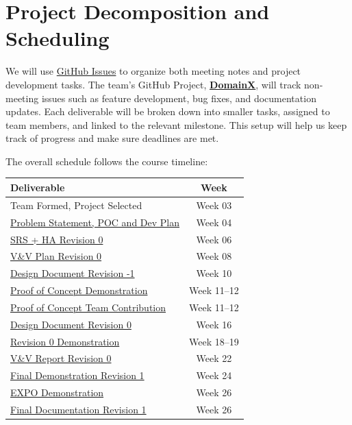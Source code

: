 \documentclass{article}
\begin{document}
\section{Project Decomposition and Scheduling}

We will use \href{https://github.com/thaafei/DomainX/issues}{GitHub Issues} to organize both meeting notes and project development tasks.
The team’s GitHub Project, \href{https://github.com/users/thaafei/projects/6}{\textbf{DomainX}}, will track non-meeting issues such as feature development, bug fixes, and documentation updates.
Each deliverable will be broken down into smaller tasks, assigned to team members, and linked to the relevant milestone.
This setup will help us keep track of progress and make sure deadlines are met.

The overall schedule follows the course timeline:

\begin{center}
\begin{tabular}{|l|c|}
\hline
\textbf{Deliverable} & \textbf{Week} \\
\hline
Team Formed, Project Selected & Week 03 \\
\href{https://github.com/thaafei/DomainX/milestone/1}{Problem Statement, POC and Dev Plan} & Week 04 \\
\href{https://github.com/thaafei/DomainX/milestone/2}{SRS + HA Revision 0} & Week 06 \\
\href{https://github.com/thaafei/DomainX/milestone/3}{V\&V Plan Revision 0} & Week 08 \\
\href{https://github.com/thaafei/DomainX/milestone/13}{Design Document Revision -1} & Week 10 \\
\href{https://github.com/thaafei/DomainX/milestone/5}{Proof of Concept Demonstration} & Week 11--12 \\
\href{https://github.com/thaafei/DomainX/milestone/12}{Proof of Concept Team Contribution} & Week 11--12 \\
\href{https://github.com/thaafei/DomainX/milestone/6}{Design Document Revision 0} & Week 16 \\
\href{https://github.com/thaafei/DomainX/milestone/7}{Revision 0 Demonstration} & Week 18--19 \\
\href{https://github.com/thaafei/DomainX/milestone/8}{V\&V Report Revision 0} & Week 22 \\
\href{https://github.com/thaafei/DomainX/milestone/9}{Final Demonstration Revision 1} & Week 24 \\
\href{https://github.com/thaafei/DomainX/milestone/10}{EXPO Demonstration} & Week 26 \\
\href{https://github.com/thaafei/DomainX/milestone/11}{Final Documentation Revision 1} & Week 26 \\
\hline
\end{tabular}
\end{center}
\end{document}
